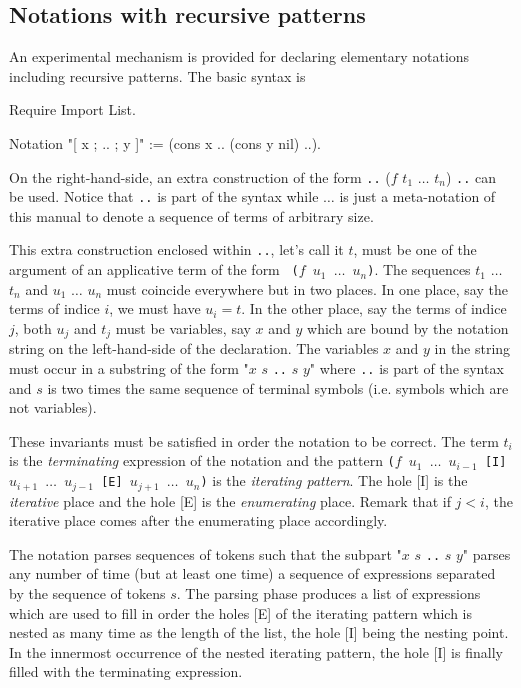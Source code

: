 \subsection{Notations with recursive patterns}

An experimental mechanism is provided for declaring elementary
notations including recursive patterns. The basic syntax is

\begin{coq_eval}
Require Import List.
\end{coq_eval}

\begin{coq_example*}
Notation "[ x ; .. ; y ]" := (cons x .. (cons y nil) ..).
\end{coq_example*}

On the right-hand-side, an extra construction of the form {\tt ..} ($f$
$t_1$ $\ldots$ $t_n$) {\tt ..} can be used. Notice that {\tt ..} is part of
the {\Coq} syntax while $\ldots$ is just a meta-notation of this
manual to denote a sequence of terms of arbitrary size.

This extra construction enclosed within {\tt ..}, let's call it $t$,
must be one of the argument of an applicative term of the form {\tt
($f$ $u_1$ $\ldots$ $u_n$)}. The sequences $t_1$ $\ldots$ $t_n$ and
$u_1$ $\ldots$ $u_n$ must coincide everywhere but in two places. In
one place, say the terms of indice $i$, we must have $u_i = t$. In the
other place, say the terms of indice $j$, both $u_j$ and $t_j$ must be
variables, say $x$ and $y$ which are bound by the notation string on
the left-hand-side of the declaration. The variables $x$ and $y$ in
the string must occur in a substring of the form "$x$ $s$ {\tt ..} $s$
$y$" where {\tt ..} is part of the syntax and $s$ is two times the
same sequence of terminal symbols (i.e. symbols which are not
variables).

These invariants must be satisfied in order the notation to be
correct.  The term $t_i$ is the {\em terminating} expression of
the notation and the pattern {\tt ($f$ $u_1$ $\ldots$ $u_{i-1}$ {\rm [I]}
$u_{i+1}$ $\ldots$ $u_{j-1}$ {\rm [E]} $u_{j+1}$ $\ldots$ $u_{n}$)} is the
{\em iterating pattern}. The hole [I] is the {\em iterative} place
and the hole [E] is the {\em enumerating} place. Remark that if $j<i$, the
iterative place comes after the enumerating place accordingly.

The notation parses sequences of tokens such that the subpart "$x$ $s$
{\tt ..} $s$ $y$" parses any number of time (but at least one time) a
sequence of expressions separated by the sequence of tokens $s$. The
parsing phase produces a list of expressions which
are used to fill in order the holes [E] of the iterating pattern
which is nested as many time as the length of the list, the hole [I]
being the nesting point. In the innermost occurrence of the nested
iterating pattern, the hole [I] is finally filled with the terminating
expression.

